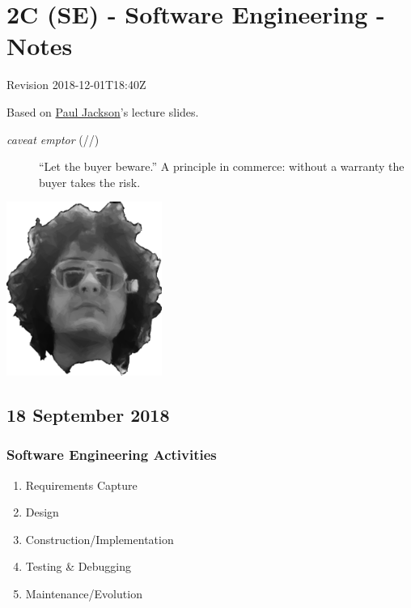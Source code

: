 \documentclass[a4paper]{article}
\date{}
\providecommand{\tightlist}{%
  \setlength{\itemsep}{0pt}\setlength{\parskip}{0pt}}
\begin{document}
\hypertarget{2c-se---software-engineering---notes}{%
\section{2C (SE) - Software Engineering -
Notes}\label{2c-se---software-engineering---notes}}
Revision 2018-12-01T18:40Z

Based on \href{http://homepages.inf.ed.ac.uk/pbj/}{Paul Jackson}'s lecture slides.

\begin{description}
    \item[\textit{caveat emptor} (//)] ``Let the buyer beware.'' A principle in commerce: without a warranty the buyer takes the risk.
\end{description}

\vfill
\begin{center}    
  \includegraphics [width=2in] {2C-SE.assets/output1000.png}
\end{center}

\tableofcontents
\newpage

\hypertarget{18-september-2018}{%
\subsection{18 September 2018}\label{18-september-2018}}

\hypertarget{software-engineering-activities}{%
\subsubsection{Software Engineering
Activities}\label{software-engineering-activities}}

\begin{enumerate}
\def\labelenumi{\arabic{enumi}.}
\tightlist
\item
  Requirements Capture
\item
  Design
\item
  Construction/Implementation
\item
  Testing \& Debugging
\item
  Maintenance/Evolution
\end{enumerate}
\end{document}
